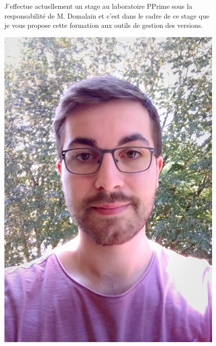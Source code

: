 \documentclass{beamer}
\begin{document}
\begin{frame}
\begin{figure}[!htb]
\begin{minipage}{0.65\textwidth}
\begin{flushleft}
                J'effectue actuellement un stage au laboratoire PPrime sous la responsabilité de M. Domalain et c'est dans le cadre de ce stage que je vous propose cette formation aux outils de gestion des versions.
            \end{flushleft}
        \end{minipage}
        \hfill
        \begin{minipage}{0.33\textwidth}
            \begin{flushright}
                \includegraphics[scale=0.05]{images/me.jpg}
            \end{flushright}
        \end{minipage}
    \end{figure}
\end{frame}
\end{document}

